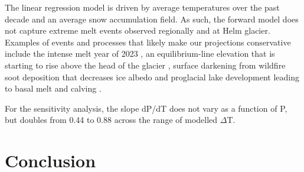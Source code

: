 \documentclass[annals,twocolumn,letterpaper]{igs.cls}
\begin{document}
The linear regression model is driven by average temperatures over the past decade and an average snow accumulation field. As such, the forward model does not capture extreme melt events observed regionally and at Helm glacier. Examples of events and processes that likely make our projections conservative include the intense melt year of 2023 \citep{Menounos2025}, an equilibrium-line elevation that is starting to rise above the head of the glacier \citep{Bevington2025}, surface darkening from wildfire soot deposition that decreases ice albedo \citep{Menounos2025,AubryWake2022} and proglacial lake development leading to basal melt and calving \citep{Carrivick2013,Shugar2020}. 

For the sensitivity analysis, the slope dP/dT does not vary as a function of P, but doubles from 0.44 to 0.88 across the range of modelled $\Delta$T. 

\section{Conclusion}



\end{document}
